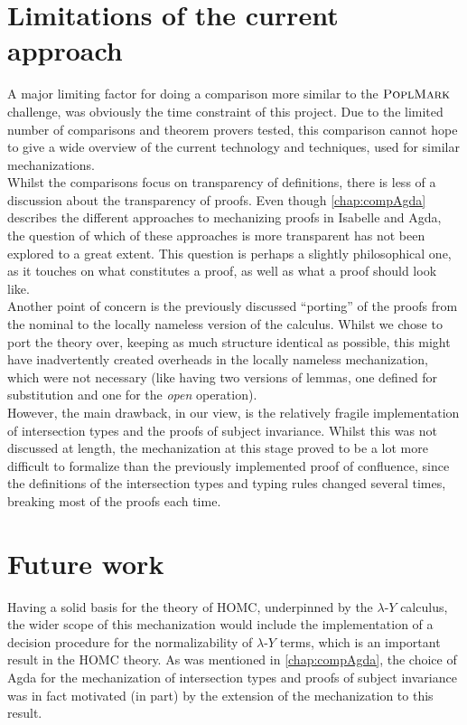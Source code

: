 \documentclass[a4paper, 12pt, twoside]{style/ociamthesis}
\theoremstyle{plain}
\theoremstyle{definition}
\theoremstyle{remark}
\newcommand{\lamy}{\lambda\text{-}Y}
\newcommand{\poplm}{\textsc{PoplMark}}
\begin{document}
\section{Limitations of the current
approach}\label{limitations-of-the-current-approach}

A major limiting factor for doing a comparison more similar to the
\(\poplm\) challenge, was obviously the time constraint of this project.
Due to the limited number of comparisons and theorem provers tested,
this comparison cannot hope to give a wide overview of the current
technology and techniques, used for similar mechanizations.\\
Whilst the comparisons focus on transparency of definitions, there is
less of a discussion about the transparency of proofs. Even though
\cref{chap:compAgda} describes the different approaches to mechanizing
proofs in Isabelle and Agda, the question of which of these approaches
is more transparent has not been explored to a great extent. This
question is perhaps a slightly philosophical one, as it touches on what
constitutes a proof, as well as what a proof should look like.\\
Another point of concern is the previously discussed ``porting'' of the
proofs from the nominal to the locally nameless version of the calculus.
Whilst we chose to port the theory over, keeping as much structure
identical as possible, this might have inadvertently created overheads
in the locally nameless mechanization, which were not necessary (like
having two versions of lemmas, one defined for substitution and one for
the \emph{open} operation).\\
However, the main drawback, in our view, is the relatively fragile
implementation of intersection types and the proofs of subject
invariance. Whilst this was not discussed at length, the mechanization
at this stage proved to be a lot more difficult to formalize than the
previously implemented proof of confluence, since the definitions of the
intersection types and typing rules changed several times, breaking most
of the proofs each time.

\section{Future work}\label{future-work}

Having a solid basis for the theory of HOMC, underpinned by the
\(\lamy\) calculus, the wider scope of this mechanization would include
the implementation of a decision procedure for the normalizability of
\(\lamy\) terms, which is an important result in the HOMC theory. As was
mentioned in \cref{chap:compAgda}, the choice of Agda for the
mechanization of intersection types and proofs of subject invariance was
in fact motivated (in part) by the extension of the mechanization to
this result.
\end{document}
